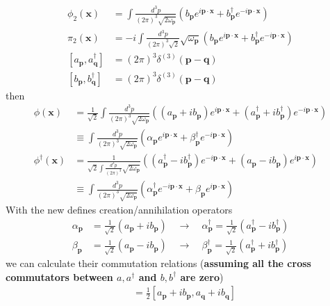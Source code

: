 \documentclass[../main.tex]{subfiles}
\begin{document}
\begin{enumerate}[(a)]
\begin{align}
\phi_2(\mathbf{x})&=\int\frac{d^3p}{(2\pi)^3\sqrt{2\omega_\mathbf{p}}}\left(b_\mathbf{p}e^{i\mathbf{p}\cdot\mathbf{x}}+b^\dagger_\mathbf{p}e^{-i\mathbf{p}\cdot\mathbf{x}}\right)\\
\pi_2(\mathbf{x})&=-i\int\frac{d^3p}{(2\pi)^3\sqrt{2}}\sqrt{\omega_\mathbf{p}}\left(b_\mathbf{p}e^{i\mathbf{p}\cdot\mathbf{x}}+b^\dagger_\mathbf{p}e^{-i\mathbf{p}\cdot\mathbf{x}}\right)\\
[a_\mathbf{p},a^\dagger_\mathbf{q}]&=(2\pi)^3\delta^{(3)}(\mathbf{p}-\mathbf{q})\\
[b_\mathbf{p},b^\dagger_\mathbf{q}]&=(2\pi)^3\delta^{(3)}(\mathbf{p}-\mathbf{q})
\end{align}
then
\begin{align}
\phi(\mathbf{x})&=\frac{1}{\sqrt{2}}\int\frac{d^3p}{(2\pi)^3\sqrt{2\omega_\mathbf{p}}}\left((a_\mathbf{p}+ib_\mathbf{p})e^{i\mathbf{p}\cdot\mathbf{x}}+(a^\dagger_\mathbf{p}+ib^\dagger_\mathbf{p})e^{-i\mathbf{p}\cdot\mathbf{x}}\right)\\
&\equiv\int\frac{d^3p}{(2\pi)^3\sqrt{2\omega_\mathbf{p}}}\left(\alpha_\mathbf{p}e^{i\mathbf{p}\cdot\mathbf{x}}+\beta^\dagger_\mathbf{p} e^{-i\mathbf{p}\cdot\mathbf{x}}\right)\\
\phi^\dagger(\mathbf{x})&=\frac{1}{\sqrt{2}\int\frac{d^3p}{(2\pi)^3}\sqrt{2\omega_\mathbf{p}}}\left((a^\dagger_\mathbf{p}-ib^\dagger_\mathbf{p})e^{-i\mathbf{p}\cdot\mathbf{x}}+(a_\mathbf{p}-ib_\mathbf{p})e^{i\mathbf{p}\cdot\mathbf{x}}\right)\\
&\equiv\int\frac{d^3p}{(2\pi)^3\sqrt{2\omega_\mathbf{p}}}\left(\alpha^\dagger_\mathbf{p}e^{-i\mathbf{p}\cdot\mathbf{x}}+\beta_\mathbf{p}e^{i\mathbf{p}\cdot\mathbf{x}}\right)
\end{align}
With the new defines creation/annihilation operators
\begin{align}
\alpha_\mathbf{p}&=\frac{1}{\sqrt{2}}(a_\mathbf{p}+ib_\mathbf{p})\quad\rightarrow\quad \alpha^\dagger_\mathbf{p}=\frac{1}{\sqrt{2}}(a^\dagger_\mathbf{p}-ib^\dagger_\mathbf{p})\\
\beta_\mathbf{p}&=\frac{1}{\sqrt{2}}(a_\mathbf{p}-ib_\mathbf{p})\quad\rightarrow\quad \beta^\dagger_\mathbf{p}=\frac{1}{\sqrt{2}}(a^\dagger_\mathbf{p}+ib^\dagger_\mathbf{p})
\end{align}
we can calculate their commutation relations ({\bf assuming all the cross commutators between $a,a^\dagger$ and $b, b^\dagger$ are zero})
\begin{align}
[\alpha_\mathbf{p},\alpha_\mathbf{q}]
&=\frac{1}{2}[a_\mathbf{p}+ib_\mathbf{p},a_\mathbf{q}+ib_\mathbf{q}]\\

\end{align}
\end{enumerate}
\end{document}
